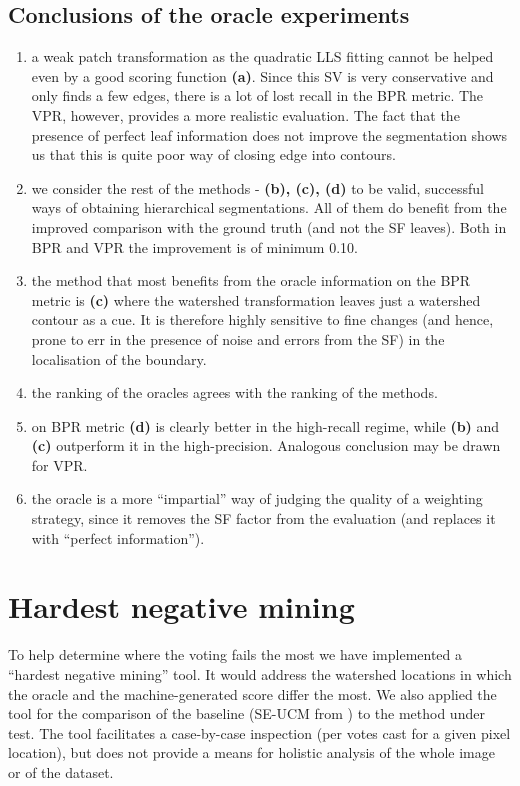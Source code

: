 \subsection{Conclusions of the oracle experiments}
\begin{enumerate}
 \item a weak patch transformation as the quadratic LLS fitting cannot be helped even by a good scoring function {\bf (a)}. Since this SV is very conservative and only finds a few edges, there is a lot of lost recall in the BPR metric. The VPR, however, provides a more realistic evaluation. The fact that the presence of perfect leaf information does not improve the segmentation shows us that this is quite poor way of closing edge into contours.
 \item we consider the rest of the methods - {\bf (b), (c), (d)} to be valid, successful ways of obtaining hierarchical segmentations. All of them do benefit from the improved comparison with the ground truth (and not the SF leaves). Both in BPR and VPR the improvement is of minimum 0.10.
 \item the method that most benefits from the oracle information on the BPR metric is {\bf (c)} where the watershed transformation leaves just a watershed contour as a cue. It is therefore highly %
 sensitive to fine changes (and hence, prone to err in the presence of noise and errors from the SF) in the localisation of the boundary.
 \item the ranking of the oracles agrees with the ranking of the methods.
 \item on BPR metric {\bf (d)} is clearly better in the high-recall regime, while {\bf (b)} and {\bf (c)} outperform it in the high-precision. Analogous conclusion may be drawn for VPR.
 \item the oracle is a more ``impartial'' way of judging the quality of a weighting strategy, since it removes the SF factor from the evaluation (and replaces it with ``perfect information'').
\end{enumerate}

\section{Hardest negative mining}
To help determine where the voting fails the most we have implemented a ``hardest negative mining'' tool. It would address the watershed locations in which the oracle and the machine-generated score differ the most. We also applied the tool for the comparison of the baseline (SE-UCM from ) to the method under test. The tool facilitates a case-by-case %
inspection (per votes cast for a given pixel location), but does not provide a means for holistic analysis of the whole image or of the dataset.

